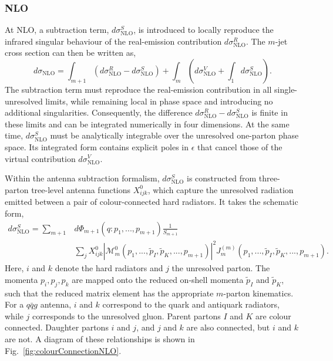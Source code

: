\subsubsection{NLO}

At NLO, a subtraction term, $d\sigma_\text{NLO}^S$, is introduced to locally
reproduce the infrared singular behaviour of the real-emission contribution
$d\sigma_\text{NLO}^R$. The $m$-jet cross section can then be written as,
\begin{equation}\label{eq:nloSubScheme}
    d\sigma_\text{NLO} = \int_{m+1}\left(d\sigma^R_\text{NLO}-d\sigma^S_\text{NLO}\right)+\int_m\left(d\sigma^V_\text{NLO}+\int_1 d\sigma^S_\text{NLO}\right).
\end{equation}
The subtraction term must reproduce the real-emission contribution in all
single-unresolved limits, while remaining local in phase space and introducing no
additional singularities. Consequently, the difference
$d\sigma_\text{NLO}^R-d\sigma_\text{NLO}^S$ is finite in these limits and can be
integrated numerically in four dimensions. At the same time, $d\sigma_\text{NLO}^S$
must be analytically integrable over the unresolved one-parton phase space. Its
integrated form contains explicit poles in $\epsilon$ that cancel those of the
virtual contribution $d\sigma_\text{NLO}^V$.

Within the antenna subtraction formalism, $d\sigma_\text{NLO}^S$ is constructed
from three-parton tree-level antenna functions $X_{ijk}^0$, which capture the
unresolved radiation emitted between a pair of colour-connected hard radiators. It
takes the schematic form,
\begin{equation}
    \begin{aligned}
        d\sigma^S_\text{NLO} = \sum_{m+1}&d\Phi_{m+1}(q:p_1,...,p_{m+1})\frac1{S_{m+1}}\\&\sum_j X_{ijk}^0|\mathcal M_m^0(p_1,...,\tilde p_I,\tilde p_K,...,p_{m+1})|^2J_m^{(m)}(p_1,...,\tilde p_I,\tilde p_K,...,p_{m+1}).
    \end{aligned}
\end{equation}
Here, $i$ and $k$ denote the hard radiators and $j$ the unresolved parton. The
momenta $p_i,p_j,p_k$ are mapped onto the reduced on-shell momenta $\tilde p_I$
and $\tilde p_K$, such that the reduced matrix element has the appropriate
$m$-parton kinematics. For a $q\bar qg$ antenna, $i$ and $k$ correspond to the
quark and antiquark radiators, while $j$ corresponds to the unresolved gluon.
Parent partons $I$ and $K$
are colour connected. Daughter partons $i$ and $j$, and $j$ and $k$ are also
connected, but $i$ and $k$ are not. A diagram of these relationships is shown in
Fig.~\ref{fig:colourConnectionNLO}.

